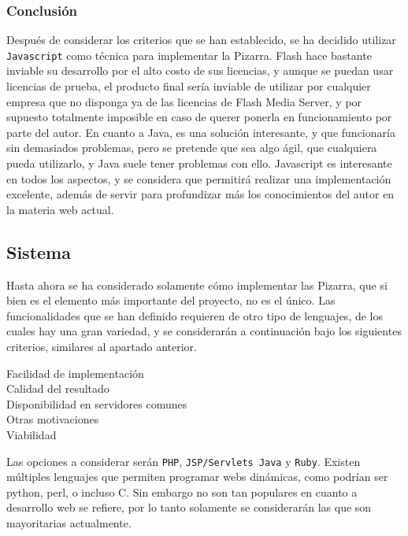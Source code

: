 \subsubsection{Conclusión}
Después de considerar los criterios que se han establecido, se ha decidido utilizar \texttt{Javascript} como técnica para implementar la Pizarra. Flash hace bastante inviable su desarrollo por el alto costo de sus licencias, y aunque se puedan usar licencias de prueba, el producto final sería inviable de utilizar por cualquier empresa que no disponga ya de las licencias de Flash Media Server, y por supuesto totalmente imposible en caso de querer ponerla en funcionamiento por parte del autor. En cuanto a Java, es una solución interesante, y que funcionaría sin demasiados problemas, pero se pretende que sea algo ágil, que cualquiera pueda utilizarlo, y Java suele tener problemas con ello. Javascript es interesante en todos los aspectos, y se considera que permitirá realizar una implementación excelente, además de servir para profundizar más los conocimientos del autor en la materia web actual.

\subsection{Sistema}
Hasta ahora se ha considerado solamente cómo implementar las Pizarra, que si bien es el elemento más importante del proyecto, no es el único. Las funcionalidades que se han definido requieren de otro tipo de lenguajes, de los cuales hay una gran variedad, y se considerarán a continuación bajo los siguientes criterios, similares al apartado anterior.

\begin{description}
	\item[Facilidad de implementación]
	\item[Calidad del resultado]
	\item[Disponibilidad en servidores comunes] 
	\item[Otras motivaciones]
	\item[Viabilidad]
\end{description}

Las opciones a considerar serán \texttt{PHP}, \texttt{JSP/Servlets Java} y \texttt{Ruby}. Existen múltiples lenguajes que permiten programar webs dinámicas, como podrían ser python, perl, o incluso C. Sin embargo no son tan populares en cuanto a desarrollo web se refiere, por lo tanto solamente se considerarán las que son mayoritarias actualmente.

